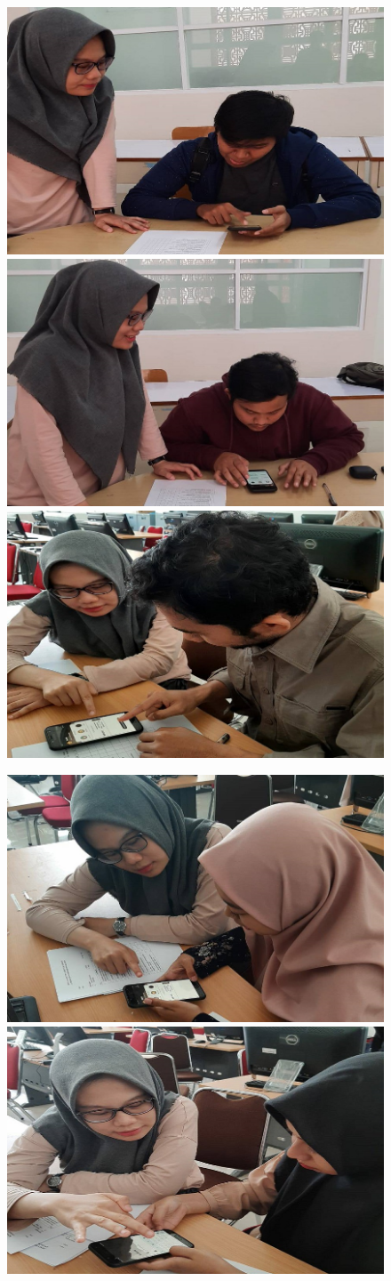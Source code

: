 \begin{figure}[htp]
\centering
\includegraphics[width=.3\textwidth]{gambar/lampiran/firman_sus.jpg}\quad
\includegraphics[width=.3\textwidth]{gambar/lampiran/ariq_sus.jpg}\quad
\includegraphics[width=.3\textwidth]{gambar/lampiran/safrul_sus.jpg}

\medskip

\includegraphics[width=.3\textwidth]{gambar/lampiran/lia_sus.jpg}\quad
\includegraphics[width=.3\textwidth]{gambar/lampiran/anis_sus.jpg}

\label{sus-mahasiswa}
\end{figure}





%
%
